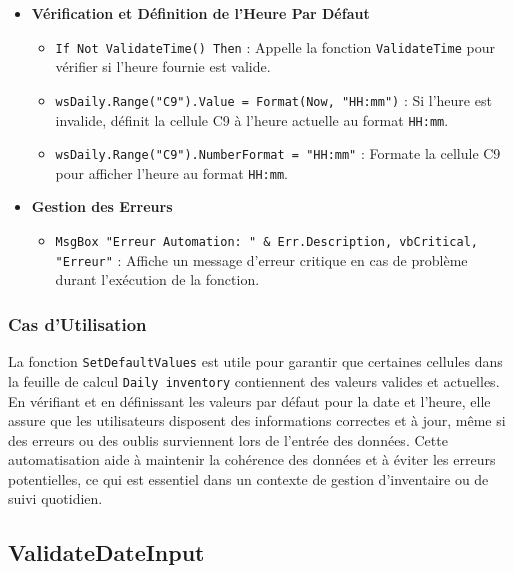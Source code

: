 \documentclass[a4paper, oneside, 12pt, final]{extreport}
\begin{document}
\begin{itemize}
     \item\textbf{Vérification et Définition de l'Heure Par Défaut}

\begin{itemize}
    \item \texttt{If Not ValidateTime() Then} : Appelle la fonction \texttt{ValidateTime} pour vérifier si l'heure fournie est valide.
    \item \texttt{wsDaily.Range("C9").Value = Format(Now, "HH:mm")} : Si l'heure est invalide, définit la cellule C9 à l'heure actuelle au format \texttt{HH:mm}.
    \item \texttt{wsDaily.Range("C9").NumberFormat = "HH:mm"} : Formate la cellule C9 pour afficher l'heure au format \texttt{HH:mm}.
\end{itemize}

      \item\textbf{Gestion des Erreurs}

\begin{itemize}
    \item \texttt{MsgBox "Erreur Automation: " \& Err.Description, vbCritical, "Erreur"} : Affiche un message d'erreur critique en cas de problème durant l'exécution de la fonction.
\end{itemize}

\end{itemize}
\subsubsection{Cas d'Utilisation}

La fonction \texttt{SetDefaultValues} est utile pour garantir que certaines cellules dans la feuille de calcul \texttt{Daily inventory} contiennent des valeurs valides et actuelles. En vérifiant et en définissant les valeurs par défaut pour la date et l'heure, elle assure que les utilisateurs disposent des informations correctes et à jour, même si des erreurs ou des oublis surviennent lors de l'entrée des données. Cette automatisation aide à maintenir la cohérence des données et à éviter les erreurs potentielles, ce qui est essentiel dans un contexte de gestion d'inventaire ou de suivi quotidien.
\subsection{ValidateDateInput}
\end{document}

